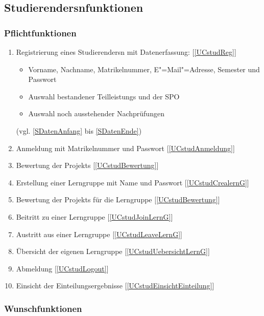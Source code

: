 \documentclass[parskip=full]{scrartcl}
\newcommand{\swtLabel}[1]{\textbf{/#1\arabic*0/}}
\newcommand{\testRef}[1]{[\ref{#1}]}
\begin{document}
\subsection{\glspl{Studierender}nfunktionen}

\subsubsection{Pflichtfunktionen}

\begin{enumerate}[label=\swtLabel{FA}, resume]
  \item Registrierung eines \glspl{Studierender}n mit Datenerfassung: \testRef{UCstudReg}
  \label{FAregistrierung}
  \begin{itemize}
    \item Vorname, Nachname, \gls{Matrikelnummer}, E"=Mail"=Adresse, Semester und
    Passwort
    \item Auswahl bestandener \glspl{Teilleistung} und der \gls{SPO}
    \item Auswahl noch ausstehender Nachprüfungen 
  \end{itemize}
  (vgl.  \ref{SDatenAnfang} bis \ref{SDatenEnde})
  \item Anmeldung mit \gls{Matrikelnummer} und Passwort\label{FAStudanmeldung}
  \testRef{UCstudAnmeldung}
  \item \gls{Bewertung} der \glspl{Projekt} \label{FAbewertung} \testRef{UCstudBewertung}
  \item Erstellung einer \gls{Lerngruppe} mit Name und Passwort
  \label{FAcreatelerng} \testRef{UCstudCrealernG}
  \item \gls{Bewertung} der \glspl{Projekt} für die \gls{Lerngruppe} 
  \label{FAbewertung2} \testRef{UCstudBewertung}
  \item Beitritt zu einer \gls{Lerngruppe} \label{FAjoinLerng}
  \testRef{UCstudJoinLernG}
  \item Austritt aus einer \gls{Lerngruppe} \label{FAlergAustritt}
  \testRef{UCstudLeaveLernG}
  \item Übersicht der eigenen \gls{Lerngruppe} 
  \label{FAcheckLerng} \testRef{UCstudUebersichtLernG}
  \item Abmeldung \label{FAStudabmeldung} \testRef{UCstudLogout}
  \item Einsicht der \gls{Einteilung}sergebnisse \label{FAStudeinsicht} \testRef{UCstudEinsichtEinteilung}
\end{enumerate}

\subsubsection{Wunschfunktionen}
\end{document}
